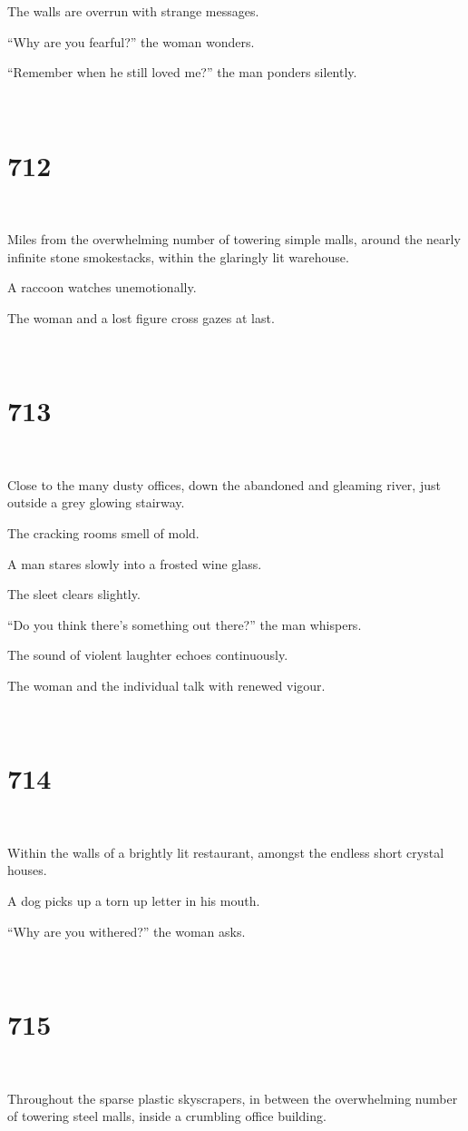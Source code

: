 \documentclass{report}
\begin{document}
The walls are overrun with strange messages.

``Why are you fearful?'' the woman wonders.

``Remember when he still loved me?'' the man ponders silently.

~
\chapter*{712}
~

Miles from the overwhelming number of towering simple malls, around the nearly infinite stone smokestacks, within the glaringly lit warehouse.

A raccoon watches unemotionally.

The woman and a lost figure cross gazes at last.

~
\chapter*{713}
~

Close to the many dusty offices, down the abandoned and gleaming river, just outside a grey glowing stairway.

The cracking rooms smell of mold.

A man stares slowly into a frosted wine glass.

The sleet clears slightly.

``Do you think there's something out there?'' the man whispers.

The sound of violent laughter echoes continuously.

The woman and the individual talk with renewed vigour.

~
\chapter*{714}
~

Within the walls of a brightly lit restaurant, amongst the endless short crystal houses.

A dog picks up a torn up letter in his mouth.

``Why are you withered?'' the woman asks.

~
\chapter*{715}
~

Throughout the sparse plastic skyscrapers, in between the overwhelming number of towering steel malls, inside a crumbling office building.
\end{document}
